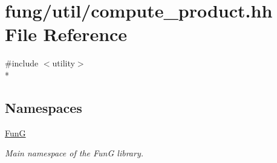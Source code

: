 \hypertarget{compute__product_8hh}{}\section{fung/util/compute\+\_\+product.hh File Reference}
\label{compute__product_8hh}
{\ttfamily \#include $<$utility$>$}\\*
\subsection*{Namespaces}
\begin{DoxyCompactItemize}
\item 
 \hyperlink{namespaceFunG}{Fun\+G}
\begin{DoxyCompactList}\small\item\em Main namespace of the Fun\+G library. \end{DoxyCompactList}\end{DoxyCompactItemize}

